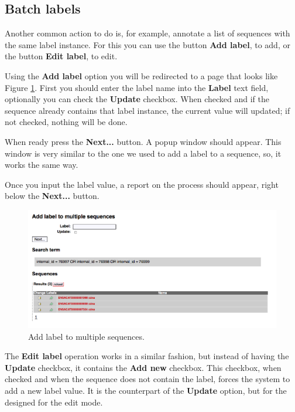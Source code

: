 \subsection{Batch labels}

Another common action to do is, for example, annotate a list of sequences with the same label instance.
For this you can use the button \textbf{Add label}, to add, or the button \textbf{Edit label}, to edit.

Using the \textbf{Add label} option you will be redirected to a page that looks like Figure \ref{fig:add_label_batch}.
First you should enter the label name into the \textbf{Label} text field, optionally you can check the \textbf{Update}
checkbox. When checked and if the sequence already contains that label instance, the current value will updated; if not
checked, nothing will be done.

When ready press the \textbf{Next...} button. A popup window should appear.
This window is very similar to the one we used to add a label to a sequence, so, it works the same way.

Once you input the label value, a report on the process should appear, right below the \textbf{Next...} button.

\begin{figure}[ht]
  \centering
    \includegraphics[scale=0.4]{add_label_batch.png}
  \caption{Add label to multiple sequences.}
  \label{fig:add_label_batch}
\end{figure}

The \textbf{Edit label} operation works in a similar fashion, but instead of having the \textbf{Update} checkbox,
it contains the \textbf{Add new} checkbox. This checkbox, when checked and when the sequence does not contain the
label, forces the system to add a new label value. It is the counterpart of the \textbf{Update} option, but for
the designed for the edit mode.

